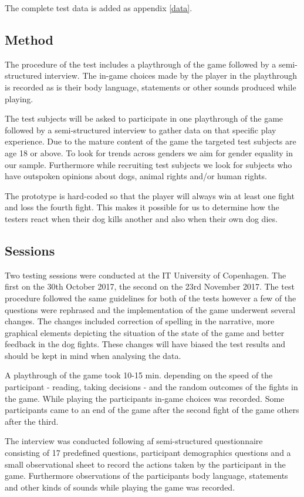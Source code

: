 The complete test data is added as appendix \ref{data}. 

\subsection{Method}
The procedure of the test includes a playthrough of the game followed by a semi-structured interview. The in-game choices made by the player in the playthrough is recorded as is their body language, statements or other sounds produced while playing.\

The test subjects will be asked to participate in one playthrough of the game followed by a semi-structured interview to gather data on that specific play experience. Due to the mature content of the game the targeted test subjects are age 18 or above. To look for trends across genders we aim for gender equality in our sample. Furthermore while recruiting test subjects we look for subjects who have outspoken opinions about dogs, animal rights and/or human rights.\

The prototype is hard-coded so that the player will always win at least one fight and loss the fourth fight. This makes it possible for us to determine how the testers react when their dog kills another and also when their own dog dies.\

\subsection{Sessions} \label{sessions}
Two testing sessions were conducted at the IT University of Copenhagen. The first on the 30th October 2017, the second on the 23rd November 2017. The test procedure followed the same guidelines for both of the tests however a few of the questions were rephrased and the implementation of the game underwent several changes. The changes included correction of spelling in the narrative, more graphical elements depicting the situation of the state of the game and better feedback in the dog fights. These changes will have biased the test results and should be kept in mind when analysing the data.\

A playthrough of the game took 10-15 min. depending on the speed of the participant - reading, taking decisions - and the random outcomes of the fights in the game. While playing the participants in-game choices was recorded. Some participants came to an end of the game after the second fight of the game others after the third.

The interview was conducted following af semi-structured questionnaire consisting of 17 predefined questions, participant demographics questions and a small observational sheet to record the actions taken by the participant in the game. Furthermore observations of the participants body language, statements and other kinds of sounds while playing the game was recorded.

